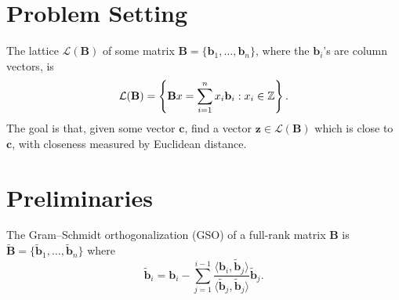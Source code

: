 





\maketitle

\begin{center}
\end{center}
\vspace{1em}

\section{Problem Setting}

The lattice $\mathcal{L}(\mathbf{B})$ of some matrix $\mathbf{B} = \{\mathbf{b}_1, \dots, \mathbf{b}_n\}$, where the $\mathbf{b}_i$'s are column vectors, is
\[
	\mathcal{L}(\mathbf{B}) = \left\{ \mathbf{B}x = \sum_{i=1}^n x_i \mathbf{b}_i : x_i \in \mathbb{Z} \right\}.
\]
The goal is that, given some vector $\mathbf{c}$, find a vector $\mathbf{z} \in \mathcal{L}(\mathbf{B})$ which is close to $\mathbf{c}$, with closeness measured by Euclidean distance.

\section{Preliminaries}

\begin{definition}
	The Gram--Schmidt orthogonalization (GSO) of a full-rank matrix $\mathbf{B}$ is $\mathbf{\tilde B} = \{\mathbf{\tilde b}_1, \dots, \mathbf{\tilde b}_n\}$ where
	\[
		\mathbf{\tilde b}_i = \mathbf{b}_i - \sum_{j=1}^{i-1} \frac{\langle \mathbf{b}_i, \mathbf{\tilde b}_j \rangle}{\langle \mathbf{\tilde b}_j, \mathbf{\tilde b}_j \rangle} \mathbf{\tilde b}_j.
	\]
\end{definition}

